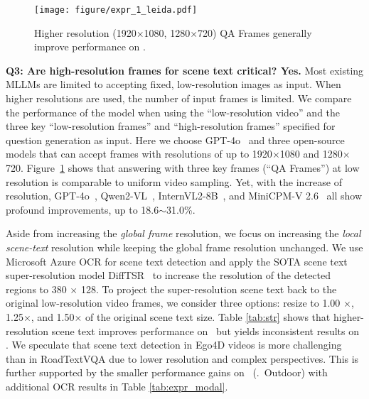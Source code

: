 {\begin{figure}[t!]
\centering
\texttt{[image: figure/expr\_1\_leida.pdf]}
\caption{Higher resolution (1920$\times$1080, 1280$\times$720) QA Frames generally improve performance on \datasetout. } 
\label{fig:expr_1_leida}
\vspace{-0.3cm}
\end{figure}


\noindent\textbf{Q3: Are high-resolution frames for scene text critical? Yes.} Most existing MLLMs are limited to accepting fixed, low-resolution images as input. When higher resolutions are used, the number of input frames is limited. We compare the performance of the model when using the “low-resolution video” and the three key “low-resolution frames” and “high-resolution frames” specified for question generation as input. Here we choose GPT-4o~\cite{achiam2023gpt} and three open-source models that can accept frames with resolutions of up to 1920$\times$1080 and 1280$\times$720. Figure~\ref{fig:expr_1_leida} shows that answering with three key frames (``QA Frames'') at low resolution is comparable to uniform video sampling. Yet, with the increase of resolution, GPT-4o~\cite{achiam2023gpt}, Qwen2-VL~\cite{wang2024qwen2}, InternVL2-8B~\cite{chen2024far}, and MiniCPM-V 2.6~\cite{yao2024minicpm} all show profound improvements, up to 18.6$\sim$31.0\%. 

Aside from increasing the \emph{global frame} resolution, we focus on increasing the \emph{local scene-text} resolution while keeping the global frame resolution unchanged. We use Microsoft Azure OCR for scene text detection and apply the SOTA scene text super-resolution model DiffTSR~\cite{zhang2024diffusion} to increase the resolution of the detected regions to 380 $\times$ 128. To project the super-resolution scene text back to the original low-resolution video frames, we consider three options: resize to 1.00 $\times$, 1.25$\times$, and 1.50$\times$ of the original scene text size.
Table \ref{tab:str} shows that higher-resolution scene text improves performance on \datasetout~but yields inconsistent results on \datasetin. We speculate that scene text detection in Ego4D videos is more challenging than in RoadTextVQA due to lower resolution and complex perspectives. This is further supported by the smaller performance gains on \datasetin~(\vs.~Outdoor) with additional OCR results in Table \ref{tab:expr_modal}.


}
